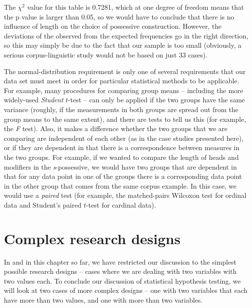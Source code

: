 The $\chi^2$  value for this table is 0.7281, which at one degree of freedom means that the p value is larger than 0.05, so we would have to conclude that there is no influence of length  on the choice of possessive  construction. However, the deviations of the observed from the expected  frequencies go in the right direction, so this may simply be due to the fact that our sample is too small (obviously, a serious corpus\hyp{}linguistic study would not be based on just 33 cases).

The normal\hyp{}distribution  requirement is only one of several requirements that our data set must meet in order for particular statistical methods to be applicable. For example, many procedures for comparing group means -- including the more widely\hyp{}used \textit{Student} $t$\hyp{}test  -- can only be applied if the two groups have the same variance  (roughly, if the measurements in both groups are spread out from the group means to the same extent), and there are tests to tell us this (for example, the \textit{F} test). Also, it makes a difference whether the two groups that we are comparing are independent of each other (as in the case studies presented here), or if they are dependent in that there is a correspondence between measures in the two groups. For example, if we wanted to compare the length of heads and modifiers in the \textit{s}-possessive,  we would have two groups that are dependent in that for any data point in one of the groups there is a corresponding data point in the other group that comes from the same corpus example. In this case, we would use a \textit{paired} test (for example, the matched\hyp{}pairs Wilcoxon  test for ordinal  data and Student's paired $t$\hyp{}test  for cardinal  data).

\section{Complex research designs}
\label{sec:complexdesigns}

In  and in this chapter so far, we have restricted our discussion to the simplest possible research designs  -- cases where we are dealing with two variables with two values each. To conclude our discussion of statistical hypothesis testing, we will look at two cases of more complex designs -- one with two variables that each have more than two values, and one with more than two variables.

